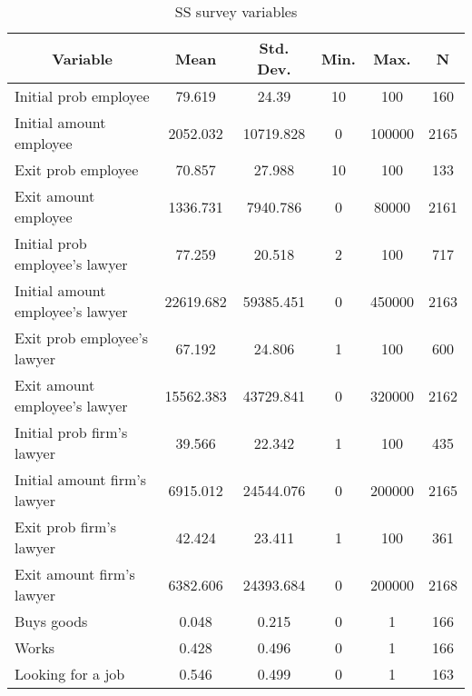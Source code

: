 
\begin{table}[htbp]\centering \caption{SS survey variables \label{sumstat}}
\begin{tabular}{l c c c c c}\hline\hline
\multicolumn{1}{c}{\textbf{Variable}} & \textbf{Mean}
 & \textbf{Std. Dev.}& \textbf{Min.} &  \textbf{Max.} & \textbf{N}\\ \hline
Initial prob employee & 79.619 & 24.39 & 10 & 100 & 160\\
Initial amount employee & 2052.032 & 10719.828 & 0 & 100000 & 2165\\
Exit prob employee & 70.857 & 27.988 & 10 & 100 & 133\\
Exit amount employee & 1336.731 & 7940.786 & 0 & 80000 & 2161\\
Initial prob employee's lawyer & 77.259 & 20.518 & 2 & 100 & 717\\
Initial amount employee's lawyer & 22619.682 & 59385.451 & 0 & 450000 & 2163\\
Exit prob employee's lawyer & 67.192 & 24.806 & 1 & 100 & 600\\
Exit amount employee's lawyer & 15562.383 & 43729.841 & 0 & 320000 & 2162\\
Initial prob firm's lawyer & 39.566 & 22.342 & 1 & 100 & 435\\
Initial amount firm's lawyer & 6915.012 & 24544.076 & 0 & 200000 & 2165\\
Exit prob firm's lawyer & 42.424 & 23.411 & 1 & 100 & 361\\
Exit amount firm's lawyer & 6382.606 & 24393.684 & 0 & 200000 & 2168\\
Buys goods & 0.048 & 0.215 & 0 & 1 & 166\\
Works & 0.428 & 0.496 & 0 & 1 & 166\\
Looking for a job & 0.546 & 0.499 & 0 & 1 & 163\\
\hline\end{tabular}
\end{table}
